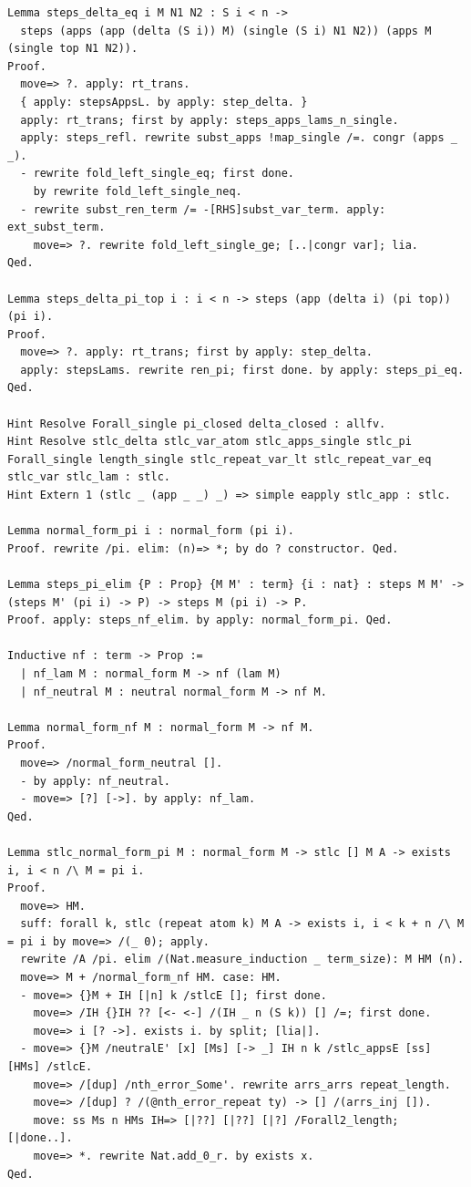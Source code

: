 \documentclass[10pt,a4paper]{amsart}
\begin{document}
\begin{lstlisting}
Lemma steps_delta_eq i M N1 N2 : S i < n ->
  steps (apps (app (delta (S i)) M) (single (S i) N1 N2)) (apps M (single top N1 N2)).
Proof.
  move=> ?. apply: rt_trans.
  { apply: stepsAppsL. by apply: step_delta. }
  apply: rt_trans; first by apply: steps_apps_lams_n_single.
  apply: steps_refl. rewrite subst_apps !map_single /=. congr (apps _ _).
  - rewrite fold_left_single_eq; first done.
    by rewrite fold_left_single_neq.
  - rewrite subst_ren_term /= -[RHS]subst_var_term. apply: ext_subst_term.
    move=> ?. rewrite fold_left_single_ge; [..|congr var]; lia.
Qed.

Lemma steps_delta_pi_top i : i < n -> steps (app (delta i) (pi top)) (pi i).
Proof.
  move=> ?. apply: rt_trans; first by apply: step_delta.
  apply: stepsLams. rewrite ren_pi; first done. by apply: steps_pi_eq.
Qed.

Hint Resolve Forall_single pi_closed delta_closed : allfv.
Hint Resolve stlc_delta stlc_var_atom stlc_apps_single stlc_pi Forall_single length_single stlc_repeat_var_lt stlc_repeat_var_eq stlc_var stlc_lam : stlc.
Hint Extern 1 (stlc _ (app _ _) _) => simple eapply stlc_app : stlc.

Lemma normal_form_pi i : normal_form (pi i).
Proof. rewrite /pi. elim: (n)=> *; by do ? constructor. Qed.

Lemma steps_pi_elim {P : Prop} {M M' : term} {i : nat} : steps M M' -> (steps M' (pi i) -> P) -> steps M (pi i) -> P.
Proof. apply: steps_nf_elim. by apply: normal_form_pi. Qed.

Inductive nf : term -> Prop :=
  | nf_lam M : normal_form M -> nf (lam M)
  | nf_neutral M : neutral normal_form M -> nf M.

Lemma normal_form_nf M : normal_form M -> nf M.
Proof.
  move=> /normal_form_neutral [].
  - by apply: nf_neutral.
  - move=> [?] [->]. by apply: nf_lam.
Qed.

Lemma stlc_normal_form_pi M : normal_form M -> stlc [] M A -> exists i, i < n /\ M = pi i.
Proof.
  move=> HM.
  suff: forall k, stlc (repeat atom k) M A -> exists i, i < k + n /\ M = pi i by move=> /(_ 0); apply.
  rewrite /A /pi. elim /(Nat.measure_induction _ term_size): M HM (n).
  move=> M + /normal_form_nf HM. case: HM.
  - move=> {}M + IH [|n] k /stlcE []; first done.
    move=> /IH {}IH ?? [<- <-] /(IH _ n (S k)) [] /=; first done.
    move=> i [? ->]. exists i. by split; [lia|].
  - move=> {}M /neutralE' [x] [Ms] [-> _] IH n k /stlc_appsE [ss] [HMs] /stlcE.
    move=> /[dup] /nth_error_Some'. rewrite arrs_arrs repeat_length.
    move=> /[dup] ? /(@nth_error_repeat ty) -> [] /(arrs_inj []).
    move: ss Ms n HMs IH=> [|??] [|??] [|?] /Forall2_length; [|done..].
    move=> *. rewrite Nat.add_0_r. by exists x.
Qed.


\end{lstlisting}
\end{document}
